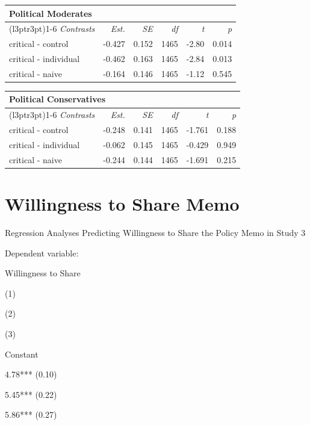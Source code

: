 \documentclass[
]{book}
\begin{document}
\begin{table}
\centering
\fontsize{13}{15}\selectfont
\begin{tabular}{lrrrrr}
\toprule
\multicolumn{6}{l}{Political Moderates} \\
\cmidrule(l{3pt}r{3pt}){1-6}
\em{Contrasts} & \em{Est.} & \em{SE} & \em{df} & \em{t} & \em{p}\\
\midrule
critical - control & -0.427 & 0.152 & 1465 & -2.80 & 0.014\\
critical - individual & -0.462 & 0.163 & 1465 & -2.84 & 0.013\\
critical - naive & -0.164 & 0.146 & 1465 & -1.12 & 0.545\\
\bottomrule
\end{tabular}
\end{table}

\begin{table}
\centering
\fontsize{13}{15}\selectfont
\begin{tabular}{lrrrrr}
\toprule
\multicolumn{6}{l}{Political Conservatives} \\
\cmidrule(l{3pt}r{3pt}){1-6}
\em{Contrasts} & \em{Est.} & \em{SE} & \em{df} & \em{t} & \em{p}\\
\midrule
critical - control & -0.248 & 0.141 & 1465 & -1.761 & 0.188\\
critical - individual & -0.062 & 0.145 & 1465 & -0.429 & 0.949\\
critical - naive & -0.244 & 0.144 & 1465 & -1.691 & 0.215\\
\bottomrule
\end{tabular}
\end{table}

\hypertarget{willingness-to-share-memo}{%
\section{Willingness to Share Memo}\label{willingness-to-share-memo}}

Regression Analyses Predicting Willingness to Share the Policy Memo in Study 3

Dependent variable:

Willingness to Share

(1)

(2)

(3)

Constant

4.78*** (0.10)

5.45*** (0.22)

5.86*** (0.27)
\end{document}
